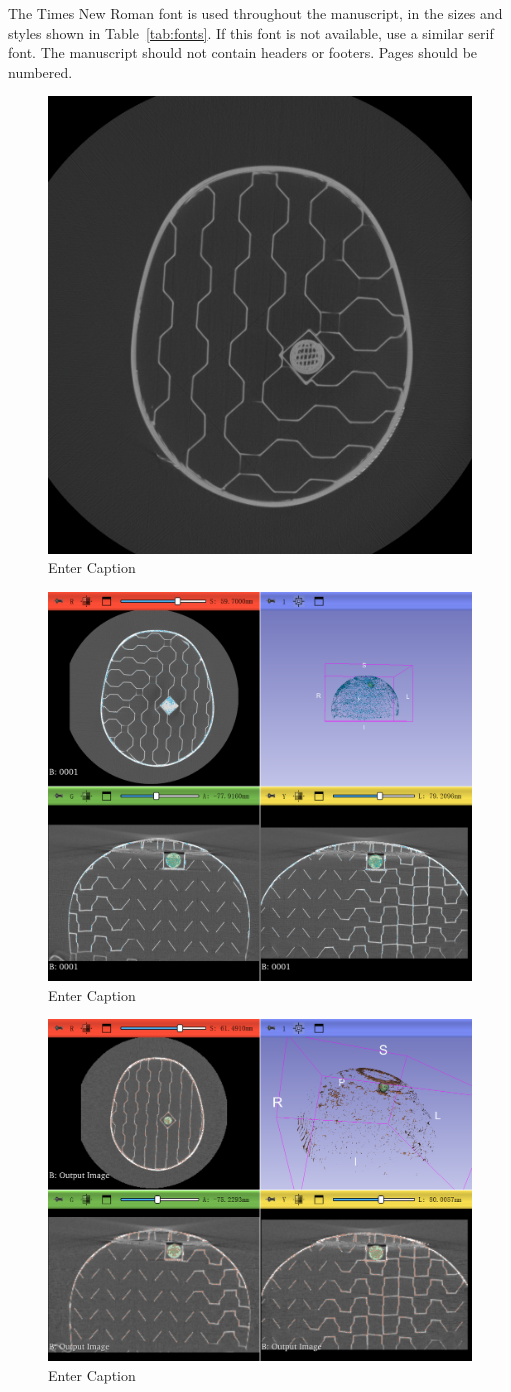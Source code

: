 \documentclass[12pt]{spieman}  %
\begin{document}
\begin{spacing}{2}
The Times New Roman font is used throughout the manuscript, in the sizes and styles shown in Table~\ref{tab:fonts}. If this font is not available, use a similar serif font. The manuscript should not contain headers or footers. Pages should be numbered.




\begin{figure}
    \centering
    \includegraphics[width=0.5\linewidth]{Pictures/CT Scan Layer.png}
    \caption{Enter Caption}
    \label{fig:enter-label}
\end{figure}



\begin{figure}
    \centering
    \includegraphics[width=0.5\linewidth]{Pictures/slicer Screenshot.png}
    \caption{Enter Caption}
    \label{fig:enter-label}
\end{figure}

\begin{figure}
    \centering
    \includegraphics[width=0.5\linewidth]{Pictures/slicer Screenshot DownSampled.png}
    \caption{Enter Caption}
    \label{fig:enter-label}
\end{figure}



\end{spacing}
\end{document}
